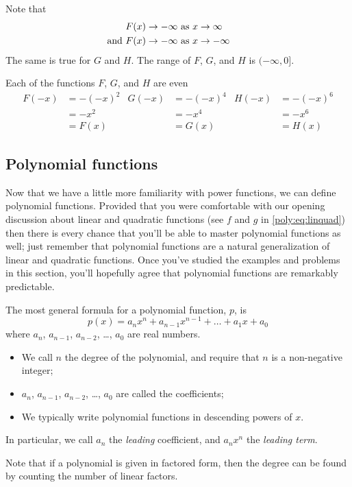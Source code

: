 \begin{doyouunderstand}
\begin{problem}
\begin{subproblem}
\begin{shortsolution}
			Note that
			\begin{align*}
				F(x)\rightarrow-\infty                          & \text{ as } x\rightarrow\infty  \\ 
				\mathllap{\text{and }}   F(x)\rightarrow-\infty & \text{ as } x\rightarrow-\infty 
			\end{align*}
			The same is true for $G$ and $H$. The range of $F$, $G$, and $H$ 
			is $(-\infty,0]$.
						
			Each of the functions $F$, $G$, and $H$ are even
			\begin{align*}
				F(-x) & =-(-x)^2 & G(-x) & =-(-x)^4 & H(-x) & =-(-x)^6 \\ 
				      & =-x^2    &       & =-x^4    &       & =-x^6    \\    
				      & =F(x)    &       & =G(x)    &       & =H(x)    
			\end{align*}
		\end{shortsolution}
	\end{subproblem}
	\end{problem}
\end{doyouunderstand}

\subsection*{Polynomial functions}
Now that we have a little more familiarity with power functions, 
we can define polynomial functions. Provided that you were comfortable
with our opening discussion about linear and quadratic functions (see 
$f$ and $g$ in \cref{poly:eq:linquad}) then there is every chance 
that you'll be able to master polynomial functions as well; just remember
that polynomial functions are a natural generalization of linear
and quadratic functions. Once you've studied the examples and problems
in this section, you'll hopefully agree that polynomial functions
are remarkably predictable.

\begin{pccdefinition}
	The most general formula for a polynomial function, $p$, is
	\[
		p(x)=a_nx^n+a_{n-1}x^{n-1}+\ldots+a_1x+a_0
	\]
	where $a_n$, $a_{n-1}$, $a_{n-2}$, \ldots, $a_0$ are real numbers.
	\begin{itemize}
		\item We call $n$ the degree of the polynomial, and require that $n$
		is a non-negative integer;
		\item $a_n$, $a_{n-1}$, $a_{n-2}$, \ldots, $a_0$ are called the coefficients;
		\item We typically write polynomial functions in descending powers of $x$.
	\end{itemize}
	In particular, we call $a_n$ the \emph{leading} coefficient, and $a_nx^n$ the 
	\emph{leading term}.
	
	Note that if a polynomial is given in factored form, then the degree can be found 
	by counting the number of linear factors.
\end{pccdefinition}

